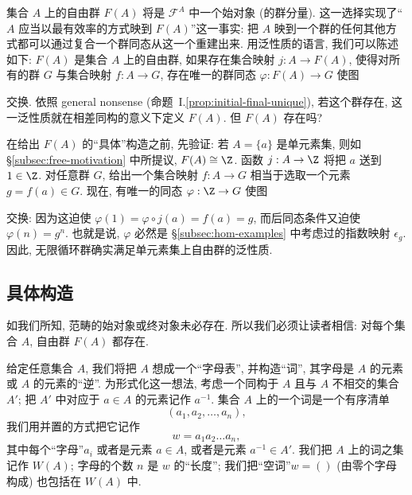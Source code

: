 集合 $A$ 上的自由群 $F(A)$ 将是 $\mathcal{F}^A$ 中一个始对象 (的群分量). 这一选择实现了``$A$ 应当以最有效率的方式映到 $F(A)$''这一事实: 把 $A$ 映到一个群的任何其他方式都可以通过复合一个群同态从这一个重建出来. 用泛性质的语言, 我们可以陈述如下: $F(A)$ 是集合 $A$ 上的自由群, 如果存在集合映射 $j : A \to F(A)$, 使得对所有的群 $G$ 与集合映射 $f : A \to G$, 存在唯一的群同态 $\varphi : F(A) \to G$ 使图
\begin{center}
\end{center}
交换. 依照 general nonsense (命题~I.\ref{prop:initial-final-unique}), 若这个群存在, 这一泛性质就在相差同构的意义下定义 $F(A)$. 但 $F(A)$ 存在吗?

在给出 $F(A)$ 的``具体''构造之前, 先验证: 若 $A = \{a\}$ 是单元素集, 则如 \S\ref{subsec:free-motivation} 中所提议, $F(A) \cong \Z$. 函数 $j : A \to \Z$ 将把 $a$ 送到 $1 \in \Z$. 对任意群 $G$, 给出一个集合映射 $f : A \to G$ 相当于选取一个元素 $g = f(a) \in G$. 现在, 有唯一的同态 $\varphi : \Z \to G$ 使图
\begin{center}
\end{center}
交换: 因为这迫使 $\varphi(1) = \varphi \circ j(a) = f(a) = g$, 而后同态条件又迫使 $\varphi(n) = g^n$. 也就是说, $\varphi$ 必然是 \S\ref{subsec:hom-examples} 中考虑过的指数映射 $\epsilon_g$. 因此, 无限循环群确实满足单元素集上自由群的泛性质.

\subsection{具体构造}
\label{subsec:free-construction}

如我们所知, 范畴的始对象或终对象未必存在. 所以我们必须让读者相信: 对每个集合 $A$, 自由群 $F(A)$ 都存在.

给定任意集合 $A$, 我们将把 $A$ 想成一个``字母表'', 并构造``词'', 其字母是 $A$ 的元素或 $A$ 的元素的``逆''. 为形式化这一想法, 考虑一个同构于 $A$ 且与 $A$ 不相交的集合 $A'$; 把 $A'$ 中对应于 $a \in A$ 的元素记作 $a^{-1}$. 集合 $A$ 上的一个词是一个有序清单
\[
(a_1, a_2, \dots, a_n),
\]
我们用并置的方式把它记作
\[
w = a_1 a_2 \dots a_n,
\]
其中每个``字母''$a_i$ 或者是元素 $a \in A$, 或者是元素 $a^{-1} \in A'$. 我们把 $A$ 上的词之集记作 $W(A)$; 字母的个数 $n$ 是 $w$ 的``长度''; 我们把``空词''$w = ()$ (由零个字母构成) 也包括在 $W(A)$ 中.


